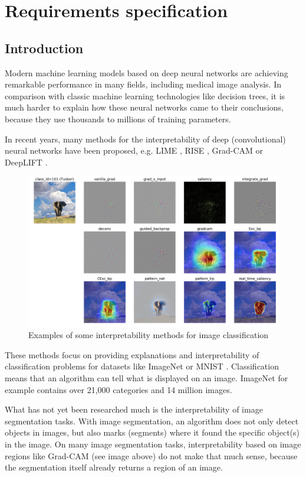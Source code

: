 \chapter{Requirements specification}
\section{Introduction}
Modern machine learning models based on deep neural networks are achieving remarkable performance in many fields, including medical image analysis. In comparison with classic machine learning technologies like decision trees, it is much harder to explain how these neural networks came to their conclusions, because they use thousands to millions of training parameters.

In recent years, many methods for the interpretability of deep (convolutional) neural networks have been proposed, e.g. LIME \cite{ribeiro2016should}, RISE \cite{Petsiuk2018rise}, Grad-CAM \cite{selvaraju2017grad} or DeepLIFT \cite{shrikumar2017learning}.

\begin{figure}[h]
\centering
\caption{Examples of some interpretability methods for image classification \cite{visualattribution}}
\includegraphics[width=14cm]{images/tusker_saliency.png}
\end{figure}

These methods focus on providing explanations and interpretability of classification problems for datasets like ImageNet \cite{imagenet_cvpr09} or MNIST \cite{lecun1998gradient}. Classification means that an algorithm can tell what is displayed on an image. ImageNet for example contains over 21,000 categories and 14 million images.

What has not yet been researched much is the interpretability of image segmentation tasks. With image segmentation, an algorithm does not only detect objects in images, but also marks (segments) where it found the specific object(s) in the image. On many image segmentation tasks, interpretability based on image regions like Grad-CAM (see image above) do not make that much sense, because the segmentation itself already returns a region of an image.


